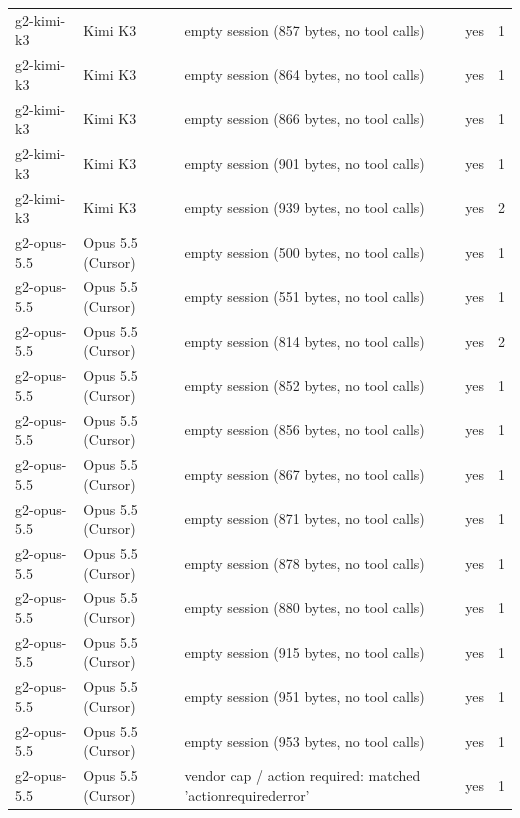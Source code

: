 \begin{tabular}{lllll}
g2-kimi-k3 & Kimi K3 & empty session (857 bytes, no tool calls) & yes & 1 \\
g2-kimi-k3 & Kimi K3 & empty session (864 bytes, no tool calls) & yes & 1 \\
g2-kimi-k3 & Kimi K3 & empty session (866 bytes, no tool calls) & yes & 1 \\
g2-kimi-k3 & Kimi K3 & empty session (901 bytes, no tool calls) & yes & 1 \\
g2-kimi-k3 & Kimi K3 & empty session (939 bytes, no tool calls) & yes & 2 \\
g2-opus-5.5 & Opus 5.5 (Cursor) & empty session (500 bytes, no tool calls) & yes & 1 \\
g2-opus-5.5 & Opus 5.5 (Cursor) & empty session (551 bytes, no tool calls) & yes & 1 \\
g2-opus-5.5 & Opus 5.5 (Cursor) & empty session (814 bytes, no tool calls) & yes & 2 \\
g2-opus-5.5 & Opus 5.5 (Cursor) & empty session (852 bytes, no tool calls) & yes & 1 \\
g2-opus-5.5 & Opus 5.5 (Cursor) & empty session (856 bytes, no tool calls) & yes & 1 \\
g2-opus-5.5 & Opus 5.5 (Cursor) & empty session (867 bytes, no tool calls) & yes & 1 \\
g2-opus-5.5 & Opus 5.5 (Cursor) & empty session (871 bytes, no tool calls) & yes & 1 \\
g2-opus-5.5 & Opus 5.5 (Cursor) & empty session (878 bytes, no tool calls) & yes & 1 \\
g2-opus-5.5 & Opus 5.5 (Cursor) & empty session (880 bytes, no tool calls) & yes & 1 \\
g2-opus-5.5 & Opus 5.5 (Cursor) & empty session (915 bytes, no tool calls) & yes & 1 \\
g2-opus-5.5 & Opus 5.5 (Cursor) & empty session (951 bytes, no tool calls) & yes & 1 \\
g2-opus-5.5 & Opus 5.5 (Cursor) & empty session (953 bytes, no tool calls) & yes & 1 \\
g2-opus-5.5 & Opus 5.5 (Cursor) & vendor cap / action required: matched 'actionrequirederror' & yes & 1 \\
\bottomrule
\end{tabular}
